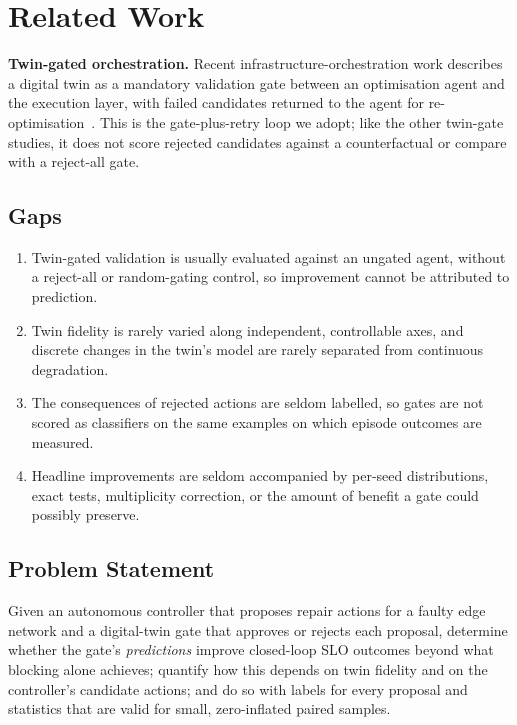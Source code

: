 \documentclass[conference]{IEEEtran}
\begin{document}
\section{Related Work}


\textbf{Twin-gated orchestration.} Recent infrastructure-orchestration work describes a digital twin as a mandatory validation gate between an optimisation agent and the execution layer, with failed candidates returned to the agent for re-optimisation~\cite{twingatedorch}. This is the gate-plus-retry loop we adopt; like the other twin-gate studies, it does not score rejected candidates against a counterfactual or compare with a reject-all gate.


\subsection*{Gaps}

\begin{enumerate}
  \renewcommand{\labelenumi}{\textbf{G\arabic{enumi}.}}
  \item Twin-gated validation is usually evaluated against an ungated agent, without a reject-all or random-gating control, so improvement cannot be attributed to prediction.
  \item Twin fidelity is rarely varied along independent, controllable axes, and discrete changes in the twin's model are rarely separated from continuous degradation.
  \item The consequences of rejected actions are seldom labelled, so gates are not scored as classifiers on the same examples on which episode outcomes are measured.
  \item Headline improvements are seldom accompanied by per-seed distributions, exact tests, multiplicity correction, or the amount of benefit a gate could possibly preserve.
\end{enumerate}

\subsection*{Problem Statement}

Given an autonomous controller that proposes repair actions for a faulty edge network and a digital-twin gate that approves or rejects each proposal, determine whether the gate's \emph{predictions} improve closed-loop SLO outcomes beyond what blocking alone achieves; quantify how this depends on twin fidelity and on the controller's candidate actions; and do so with labels for every proposal and statistics that are valid for small, zero-inflated paired samples.
\end{document}
